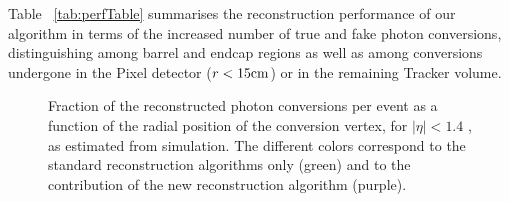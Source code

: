\documentclass[a4paper]{jpconf}
\begin{document}
 Table ~\ref{tab:perfTable} summarises the reconstruction performance of our algorithm in terms of the increased number of true and fake photon conversions, distinguishing among barrel and endcap regions as well as among conversions undergone in the Pixel detector ($r < 15 \rm cm$) or in the remaining Tracker volume.
 
  

\begin{figure}[h]
\centering
{}
\caption{Fraction of the reconstructed photon conversions per event as  a function of the radial position of the conversion vertex,   for  $|\eta|<1.4$ , as estimated
from simulation. The different colors correspond to the standard reconstruction algorithms only (green) and to the contribution of the new reconstruction algorithm (purple).}
\label{fig:effPerf}
\end{figure}


\end{document}
